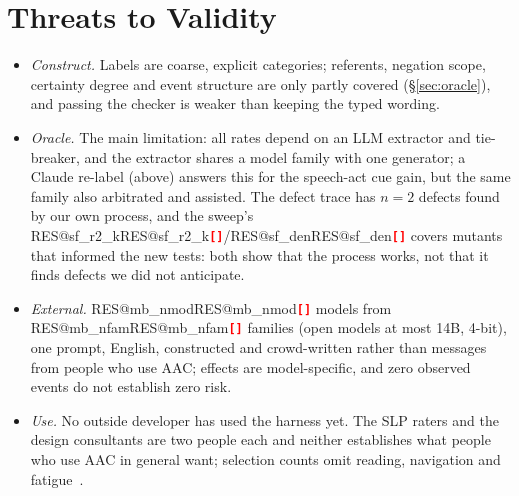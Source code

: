 \documentclass[conference,10pt]{IEEEtran}
\makeatletter
\newcommand{\RES}[1]{\ifcsname RES@#1\endcsname\csname RES@#1\endcsname\else\RESmissing{#1}\fi}
\newcommand{\RESmissing}[1]{\textcolor{red}{\textbf{\texttt{[\detokenize{#1}]}}}}
\makeatother
\begin{document}
\section{Threats to Validity}
\label{sec:threats}
\begin{itemize}\setlength{\itemsep}{0pt}\setlength{\parskip}{0pt}
\item \emph{Construct.} Labels are coarse, explicit categories; referents, negation scope, certainty degree and event structure are only partly covered (\S\ref{sec:oracle}), and passing the checker is weaker than keeping the typed wording.
\item \emph{Oracle.} The main limitation: all rates depend on an LLM extractor and tie-breaker, and the extractor shares a model family with one generator; a Claude re-label (above) answers this for the speech-act cue gain, but the same family also arbitrated and assisted. The defect trace has $n=2$ defects found by our own process, and the sweep's \RES{sf_r2_k}/\RES{sf_den} covers mutants that informed the new tests: both show that the process works, not that it finds defects we did not anticipate.
\item \emph{External.} \RES{mb_nmod} models from \RES{mb_nfam} families (open models at most 14B, 4-bit), one prompt, English, constructed and crowd-written rather than messages from people who use AAC; effects are model-specific, and zero observed events do not establish zero risk.
\item \emph{Use.} No outside developer has used the harness yet. The SLP raters and the design consultants are two people each and neither establishes what people who use AAC in general want; selection counts omit reading, navigation and fatigue~\cite{frisch2026complicated}.
\end{itemize}

\end{document}

